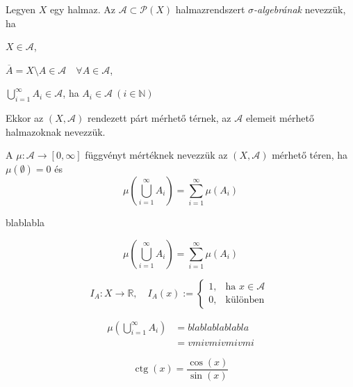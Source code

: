 \documentclass[a4paper,12pt]{article}
\DeclareMathOperator{\ctg}{ctg}
\begin{document}
	Legyen $X$ egy halmaz. Az $\mathcal{A}\subset\mathcal{P}(X)$ halmazrendszert \emph{$\sigma$-algebrának} nevezzük, ha
	\begin{compactenum}
		\item $X\in\mathcal{A}$,
		\item $\overline{A}=X\setminus A\in\mathcal{A}\quad\forall A\in\mathcal{A}$,
		\item $\bigcup_{i=1}^{\infty}A_{i}\in\mathcal{A}$, ha $A_{i}\in\mathcal{A}\ (i\in\mathbb{N})$
	\end{compactenum}
	Ekkor az $(X, \mathcal{A})$ rendezett párt mérhető térnek, az $\mathcal{A}$ elemeit mérhető halmazoknak nevezzük.
	
	A $\mu\colon\mathcal{A}\to[0,\infty]$ függvényt mértéknek nevezzük az $(X,\mathcal{A})$ mérhető téren,
	ha $\mu(\emptyset)=0$ és
	\begin{equation*}
		\mu\left(\bigcup_{i=1}^{\infty}A_{i}\right)=\sum_{i=1}^{\infty}\mu(A_{i})
	\end{equation*}
	
	blablabla
	
	\begin{equation}\label{eq-add}
		\mu\left(\bigcup_{i=1}^{\infty}A_{i}\right)=\sum_{i=1}^{\infty}\mu(A_{i})
	\end{equation}
	
	 \Az{\eqref{eq-add}}
	 
	 \begin{equation*}
	 	I_A\colon X\to\mathbb{R},\quad
	 	I_A(x):=
	 	\begin{cases}
	 		1, & \text{ha } x\in\mathcal{A} \\
	 		0, & \text{különben }
	 	\end{cases}
	 \end{equation*}
	 
	 \begin{align*}
	 	\mu\left(\bigcup_{i=1}^{\infty}A_{i}\right) & = blablablablabla \\
	 	 & = vmivmivmivmi
	 \end{align*}
	 
	 \begin{equation*}
	 	\ctg(x)=\frac{\cos(x)}{\sin(x)}
	 \end{equation*}
\end{document}
